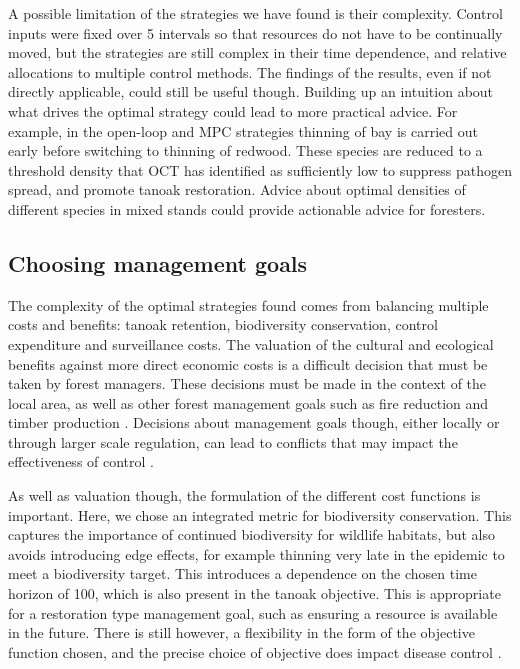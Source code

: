 A possible limitation of the strategies we have found is their complexity. Control inputs were fixed over \SI{5}{\year} intervals so that resources do not have to be continually moved, but the strategies are still complex in their time dependence, and relative allocations to multiple control methods. The findings of the results, even if not directly applicable, could still be useful though. Building up an intuition about what drives the optimal strategy could lead to more practical advice. For example, in the open-loop and MPC strategies thinning of bay is carried out early before switching to thinning of redwood. These species are reduced to a threshold density that OCT has identified as sufficiently low to suppress pathogen spread, and promote tanoak restoration. Advice about optimal densities of different species in mixed stands could provide actionable advice for foresters.

\subsection{Choosing management goals}

The complexity of the optimal strategies found comes from balancing multiple costs and benefits: tanoak retention, biodiversity conservation, control expenditure and surveillance costs. The valuation of the cultural and ecological benefits against more direct economic costs is a difficult decision that must be taken by forest managers. These decisions must be made in the context of the local area, as well as other forest management goals such as fire reduction and timber production \citep{cobb_resiliency_2017}. Decisions about management goals though, either locally or through larger scale regulation, can lead to conflicts that may impact the effectiveness of control \citep{alexander_lessons_2010}.

As well as valuation though, the formulation of the different cost functions is important. Here, we chose an integrated metric for biodiversity conservation. This captures the importance of continued biodiversity for wildlife habitats, but also avoids introducing edge effects, for example thinning very late in the epidemic to meet a biodiversity target. This introduces a dependence on the chosen time horizon of \SI{100}{\years}, which is also present in the tanoak objective. This is appropriate for a restoration type management goal, such as ensuring a resource is available in the future. There is still however, a flexibility in the form of the objective function chosen, and the precise choice of objective does impact disease control \citep{probert_decision_2016}.

